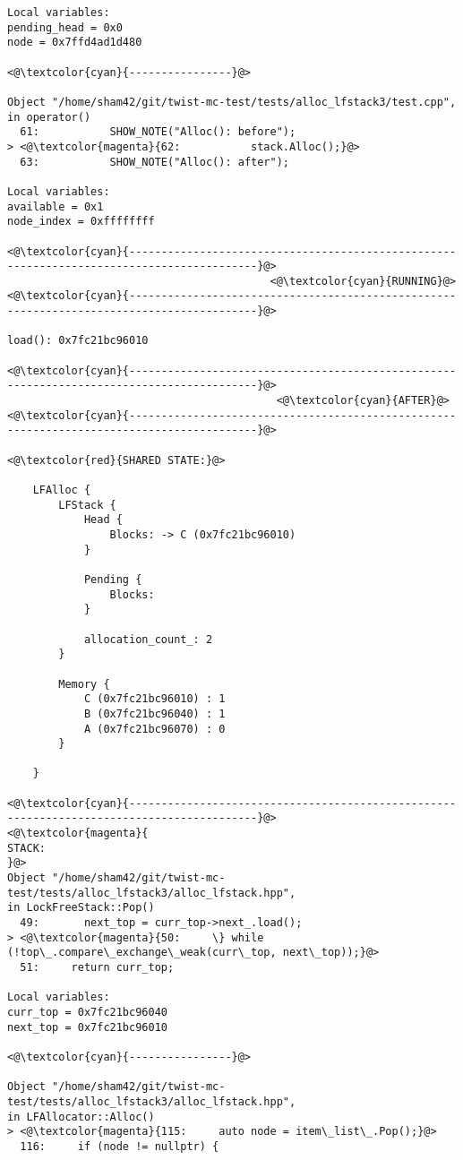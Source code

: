 \begin{adjustwidth}{-3.3cm}{-1cm}
\begin{allintypewriter}
\begin{multicols*}{2}
\begin{lstlisting}[numbers=none]
Local variables: 
pending_head = 0x0
node = 0x7ffd4ad1d480

<@\textcolor{cyan}{----------------}@>

Object "/home/sham42/git/twist-mc-test/tests/alloc_lfstack3/test.cpp",
in operator()
  61:           SHOW_NOTE("Alloc(): before");
> <@\textcolor{magenta}{62:           stack.Alloc();}@>
  63:           SHOW_NOTE("Alloc(): after");

Local variables: 
available = 0x1
node_index = 0xffffffff

<@\textcolor{cyan}{------------------------------------------------------------------------------------------}@>
                                         <@\textcolor{cyan}{RUNNING}@>
<@\textcolor{cyan}{------------------------------------------------------------------------------------------}@>

load(): 0x7fc21bc96010

<@\textcolor{cyan}{------------------------------------------------------------------------------------------}@>
                                          <@\textcolor{cyan}{AFTER}@>
<@\textcolor{cyan}{------------------------------------------------------------------------------------------}@>

<@\textcolor{red}{SHARED STATE:}@>

    LFAlloc {
	    LFStack {
		    Head {
			    Blocks: -> C (0x7fc21bc96010) 
		    }

		    Pending {
			    Blocks: 
		    }

		    allocation_count_: 2
	    }

	    Memory {
		    C (0x7fc21bc96010) : 1
		    B (0x7fc21bc96040) : 1
		    A (0x7fc21bc96070) : 0
	    }

    }

<@\textcolor{cyan}{------------------------------------------------------------------------------------------}@>
<@\textcolor{magenta}{
STACK:
}@>
Object "/home/sham42/git/twist-mc-test/tests/alloc_lfstack3/alloc_lfstack.hpp",
in LockFreeStack::Pop()
  49:       next_top = curr_top->next_.load();
> <@\textcolor{magenta}{50:     \} while (!top\_.compare\_exchange\_weak(curr\_top, next\_top));}@>
  51:     return curr_top;

Local variables: 
curr_top = 0x7fc21bc96040
next_top = 0x7fc21bc96010

<@\textcolor{cyan}{----------------}@>

Object "/home/sham42/git/twist-mc-test/tests/alloc_lfstack3/alloc_lfstack.hpp",
in LFAllocator::Alloc()
> <@\textcolor{magenta}{115:     auto node = item\_list\_.Pop();}@>
  116:     if (node != nullptr) {


\end{lstlisting}
\end{multicols*}
\end{allintypewriter}
\end{adjustwidth}
